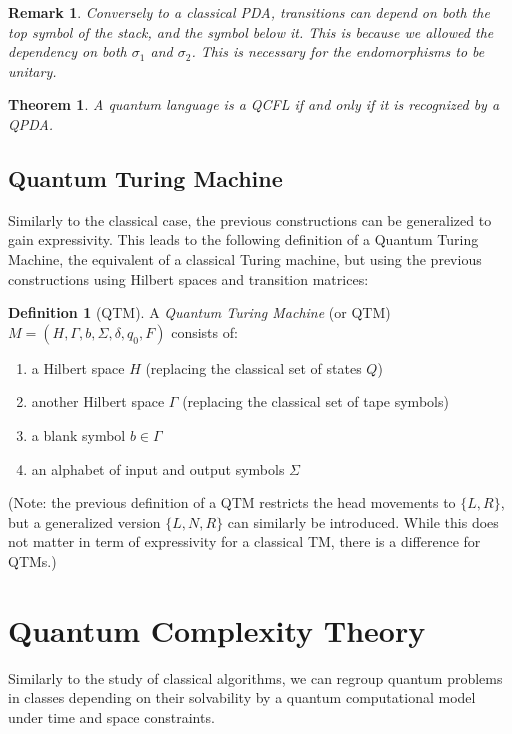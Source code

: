 \documentclass[12pt,a4paper]{article}
\theoremstyle{plain}
\newtheorem*{theorem}{Theorem}
\newtheorem*{remark}{Remark}
\theoremstyle{definition}
\newtheorem*{definition}{Definition}
\begin{document}
\begin{remark}
    Conversely to a classical PDA, transitions can depend on both the top symbol of the stack, and the symbol below it. This is because we allowed the dependency on both $\sigma_1$ and $\sigma_2$. This is necessary for the endomorphisms to be unitary. 
\end{remark}

\begin{theorem}
    A quantum language is a QCFL if and only if it is recognized by a QPDA.
\end{theorem}


\subsection{Quantum Turing Machine}
Similarly to the classical case, the previous constructions can be generalized to gain expressivity. This leads to the following definition of a Quantum Turing Machine\cite{qtm-circuits}\cite{qc-theory-bernstein}, the equivalent of a classical Turing machine, but using the previous constructions using Hilbert spaces and transition matrices:

\begin{definition}[QTM] A \emph{Quantum Turing Machine} (or QTM) $M = (H, \Gamma, b, \Sigma, \delta, q_0, F)$ consists of:
\begin{enumerate}[label=--, noitemsep]
    \item a Hilbert space $H$ (replacing the classical set of states $Q$)
    \item another Hilbert space $\Gamma$ (replacing the classical set of tape symbols)
    \item a blank symbol $b\in \Gamma$
    \item an alphabet of input and output symbols $\Sigma$
\end{enumerate}
    
(Note: the previous definition of a QTM restricts the head movements to $\{L, R\}$, but a generalized version $\{L, N, R\}$ can similarly be introduced. While this does not matter in term of expressivity for a classical TM, there is a difference for QTMs.)

\end{definition}

\section{Quantum Complexity Theory}
Similarly to the study of classical algorithms, we can regroup quantum problems in classes depending on their solvability by a quantum computational model under time and space constraints. 
\end{document}
